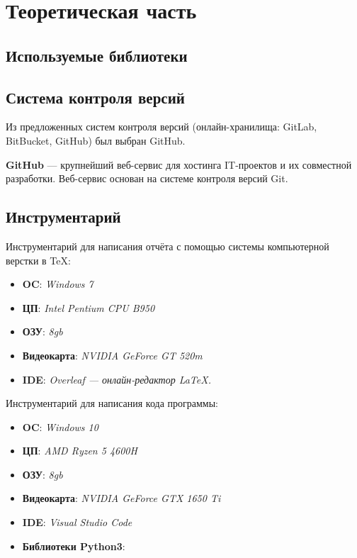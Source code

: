 \documentclass[14pt, oneside]{altsu-report}
\begin{document}

\chapter{Теоретическая часть}\label{ch1}
\section{Используемые библиотеки}

\section{Система контроля версий}
Из предложенных систем контроля версий (онлайн-хранилища: GitLab, BitBucket, GitHub) был выбран GitHub.

\textbf{GitHub} — крупнейший веб-сервис для хостинга IT-проектов и их совместной разработки. Веб-сервис основан на системе контроля версий Git.


\section{Инструментарий}
Инструментарий для написания отчёта с помощью системы компьютерной верстки в \TeX:
    \begin{itemize}
        \item \textbf{OC}: \textit{Windows 7}
        \item \textbf{ЦП}: \textit{Intel Pentium CPU B950}
        \item \textbf{ОЗУ}: \textit{8gb}
        \item \textbf{Видеокарта}: \textit{NVIDIA GeForce GT 520m}
        \item \textbf{IDE}: \textit{Overleaf — онлайн-редактор LaTeX.}
    \end{itemize}

Инструментарий для написания кода программы:
    \begin{itemize}
        \item \textbf{OC}: \textit{Windows 10}
        \item \textbf{ЦП}: \textit{AMD Ryzen 5 4600H}
        \item \textbf{ОЗУ}: \textit{8gb}
        \item \textbf{Видеокарта}: \textit{NVIDIA GeForce GTX 1650 Ti}
        \item \textbf{IDE}: \textit{Visual Studio Code}
        \item \textbf{Библиотеки Python3}: \textit{}
    \end{itemize}
\end{document}
